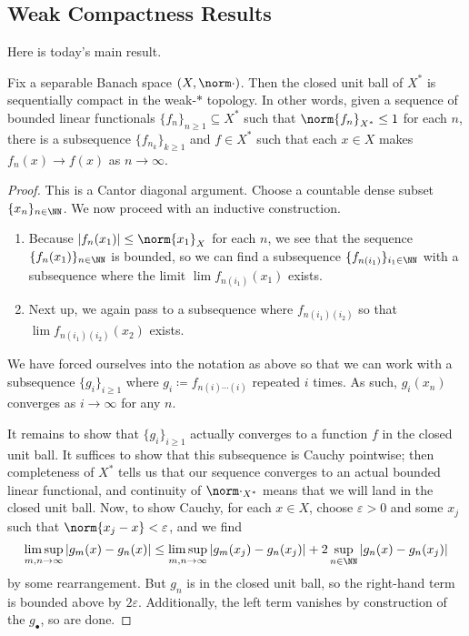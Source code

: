 \documentclass[../notes.tex]{subfiles}
\begin{document}
\subsection{Weak Compactness Results}
Here is today's main result.
\begin{theorem}[Helly] \label{thm:helly}
	Fix a separable Banach space $(X,\norm\cdot)$. Then the closed unit ball of $X^*$ is sequentially compact in the weak-$*$ topology. In other words, given a sequence of bounded linear functionals $\{f_n\}_{n\ge1}\subseteq X^*$ such that $\norm{f_n}_{X^*}\le1$ for each $n$, there is a subsequence $\{f_{n_k}\}_{k\ge1}$ and $f\in X^*$ such that each $x\in X$ makes $f_n(x)\to f(x)$ as $n\to\infty$.
\end{theorem}
\begin{proof}
	This is a Cantor diagonal argument. Choose a countable dense subset $\{x_n\}_{n\in\NN}$. We now proceed with an inductive construction.
	\begin{enumerate}
		\item Because $\left|f_n(x_1)\right|\le\norm{x_1}_X$ for each $n$, we see that the sequence $\{f_n(x_1)\}_{n\in\NN}$ is bounded, so we can find a subsequence $\{f_{n(i_1)}\}_{i_1\in\NN}$ with a subsequence where the limit $\lim f_{n(i_1)}(x_1)$ exists.
		\item Next up, we again pass to a subsequence where $f_{n(i_1)(i_2)}$ so that $\lim f_{n(i_1)(i_2)}(x_2)$ exists.
	\end{enumerate}
	We have forced ourselves into the notation as above so that we can work with a subsequence $\{g_i\}_{i\ge1}$ where $g_i\coloneqq f_{n(i)\cdots(i)}$ repeated $i$ times. As such, $g_i(x_n)$ converges as $i\to\infty$ for any $n$.

	It remains to show that $\{g_i\}_{i\ge1}$ actually converges to a function $f$ in the closed unit ball. It suffices to show that this subsequence is Cauchy pointwise; then completeness of $X^*$ tells us that our sequence converges to an actual bounded linear functional, and continuity of $\norm\cdot_{X^*}$ means that we will land in the closed unit ball. Now, to show Cauchy, for each $x\in X$, choose $\varepsilon>0$ and some $x_j$ such that $\norm{x_j-x}<\varepsilon$, and we find
	\[\limsup_{m,n\to\infty}\left|g_m(x)-g_n(x)\right|\le\limsup_{m,n\to\infty}\left|g_m(x_j)-g_n(x_j)\right|+2\sup_{n\in\NN}\left|g_n(x)-g_n(x_j)\right|\]
	by some rearrangement. But $g_n$ is in the closed unit ball, so the right-hand term is bounded above by $2\varepsilon$. Additionally, the left term vanishes by construction of the $g_\bullet$, so are done.
\end{proof}
\end{document}
